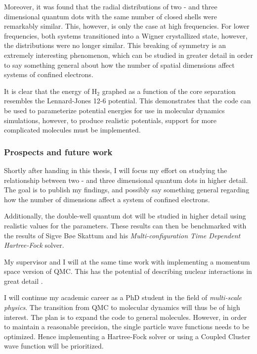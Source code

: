 Moreover, it was found that the radial distributions of two - and three dimensional quantum dots with the same number of closed shells were remarkably similar. This, however, is only the case at high frequencies. For lower frequencies, both systems transitioned into a Wigner crystallized state, however, the distributions were no longer similar. This breaking of symmetry is an extremely interesting phenomenon, which can be studied in greater detail in order to say something general about how the number of spatial dimensions affect systems of confined electrons.

It is clear that the energy of $\mathrm{H_2}$ graphed as a function of the core separation resembles the Lennard-Jones 12-6 potential. This demonstrates that the code can be used to parameterize potential energies for use in molecular dynamics simulations, however, to produce realistic potentials, support for more complicated molecules must be implemented. 

\subsubsection{Prospects and future work}

Shortly after handing in this thesis, I will focus my effort on studying the relationship between two - and three dimensional quantum dots in higher detail. The goal is to publish my findings, and possibly say something general regarding how the number of dimensions affect a system of confined electrons.

Additionally, the double-well quantum dot will be studied in higher detail using realistic values for the parameters. These results can then be benchmarked with the results of Sigve Bøe Skattum and his \textit{Multi-configuration Time Dependent Hartree-Fock} solver.

My supervisor and I will at the same time work with implementing a momentum space version of QMC. This has the potential of describing nuclear interactions in great detail \cite{momentspaceQMC}. 

I will continue my academic career as a PhD student in the field of \textit{multi-scale physics}. The transition from QMC to molecular dynamics will thus be of high interest. The plan is to expand the code to general molecules. However, in order to maintain a reasonable precision, the single particle wave functions needs to be optimized. Hence implementing a Hartree-Fock solver \cite{Shavitt} or using a Coupled Cluster wave function \cite{CCSD_WF} will be prioritized.


